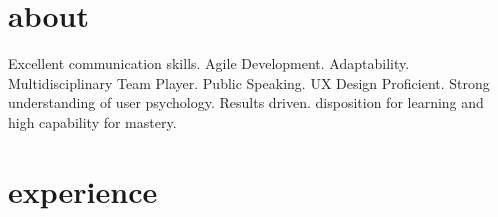 \documentclass[]{cv-style}          %
\begin{document}

\section{about}
  \vspace{-0.2cm}
Excellent communication skills. Agile Development. Adaptability. Multidisciplinary Team Player. Public Speaking. UX Design Proficient. Strong understanding of user psychology. Results driven. disposition for learning and high capability for mastery.



\section{experience}
\end{document}
